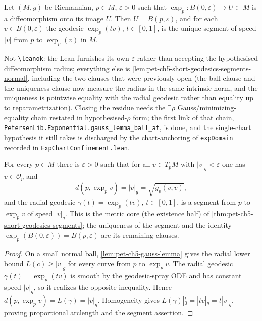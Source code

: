 \begin{theorem}
  \label{thm:pet-ch5-short-geodesics-segments}
  Let $(M,g)$ be Riemannian, $p\in M$, $\varepsilon>0$ such that
  $\exp_p:B(0,\varepsilon)\to U\subset M$ is a diffeomorphism onto its image $U$.
  Then $U=B(p,\varepsilon)$, and for each $v\in B(0,\varepsilon)$ the geodesic
  $\exp_p(tv)$, $t\in[0,1]$, is the unique segment of speed $|v|$ from $p$ to
  $\exp_p(v)$ in $M$.

  Not \texttt{\textbackslash leanok}: the Lean furnishes its own $\varepsilon$
  rather than accepting the hypothesised diffeomorphism radius; everything else is
  \cref{lem:pet-ch5-short-geodesics-segments-normal}, including the two clauses
  that were previously open (the ball clause and the uniqueness clause now measure
  the radius in the same intrinsic norm, and the uniqueness is pointwise equality
  with the radial geodesic rather than equality up to reparametrization).  Closing
  the residue needs the $\exists\rho$ Gauss/minimizing-equality chain restated in
  hypothesised-$\rho$ form; the first link of that chain,
  \texttt{PetersenLib.Exponential.gauss\_lemma\_ball\_at}, is done, and the
  single-chart hypothesis it still takes is discharged by the chart-anchoring of
  \texttt{expDomain} recorded in \texttt{ExpChartConfinement.lean}.
\end{theorem}

\begin{lemma}
  \label{lem:pet-ch5-radial-geodesic-segment}
  \leanok
  For every $p\in M$ there is $\varepsilon>0$ such that for all $v\in T_pM$ with
  $|v|_g<\varepsilon$ one has $v\in\mathcal O_p$ and
  \[
    d(p,\exp_p v)=|v|_g=\sqrt{g_p(v,v)},
  \]
  and the radial geodesic $\gamma(t)=\exp_p(tv)$, $t\in[0,1]$, is a segment from
  $p$ to $\exp_p v$ of speed $|v|_g$. This is the metric core (the existence half)
  of \cref{thm:pet-ch5-short-geodesics-segments}; the uniqueness of the segment and
  the identity $\exp_p(B(0,\varepsilon))=B(p,\varepsilon)$ are its remaining
  clauses.
\end{lemma}
\begin{proof}
  \leanok
  \sketch
  On a small normal ball, \cref{lem:pet-ch5-gauss-lemma} gives the radial lower
  bound $L(c)\ge|v|_g$ for every curve from $p$ to $\exp_pv$.  The radial geodesic
  $\gamma(t)=\exp_p(tv)$ is smooth by the geodesic-spray ODE and has constant speed
  $|v|_g$, so it realizes the opposite inequality.  Hence
  $d(p,\exp_pv)=L(\gamma)=|v|_g$.  Homogeneity gives
  $L(\gamma)|_0^t=|tv|_g=t|v|_g$, proving proportional arclength and the segment
  assertion.
\end{proof}

